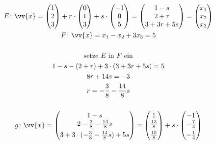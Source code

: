 \begin{gather*}
  E \colon \vv{x} = \begin{pmatrix}1 \\ 2 \\ 3\end{pmatrix} + r \cdot \begin{pmatrix}0 \\ 1 \\ 3\end{pmatrix} + s \cdot \begin{pmatrix}-1 \\ 0 \\ 5\end{pmatrix} = \begin{pmatrix}1 - s \\ 2 + r \\ 3 + 3r + 5s\end{pmatrix} = \begin{pmatrix}x_1 \\ x_2 \\ x_3\end{pmatrix} \\
  F \colon \vv{x} = x_1 - x_2 + 3x_3 = 5 \\\\
  \text{setze $E$ in $F$ ein} \\
  1 - s - (2 + r) + 3 \cdot (3 + 3r + 5s) = 5 \\
  8r + 14s = -3 \\
  r = -\frac{3}{8} - \frac{14}{8}s \\\\
  g \colon \vv{x} = \begin{pmatrix}1 - s \\ 2 - \frac{3}{8} - \frac{14}{8}s \\[0.4em] 3 + 3 \cdot (-\frac{3}{8} - \frac{14}{8}s) + 5s\end{pmatrix} = \begin{pmatrix}1 \\ \frac{13}{8} \\[0.4em] \frac{15}{8}\end{pmatrix} + s \cdot \begin{pmatrix}-1 \\ -\frac{7}{4} \\[0.4em] -\frac{1}{4}\end{pmatrix}
\end{gather*}
